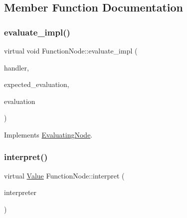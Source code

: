 \subsection{Member Function Documentation}
\mbox{\label{classFunctionNode_a697f1fdc368f5ad09284b32b4466f353}} 
\subsubsection{\texorpdfstring{evaluate\+\_\+impl()}{evaluate\_impl()}}
{\footnotesize\ttfamily virtual void Function\+Node\+::evaluate\+\_\+impl (\begin{DoxyParamCaption}\item[{\hyperlink{classSystemHandler}{System\+Handler} $\ast$}]{handler,  }\item[{\hyperlink{statics_8h_a6664c451ca7787483a7981cc1de68dbb}{E\+V\+A\+L\+U\+A\+T\+I\+O\+N\+\_\+\+T\+Y\+PE}}]{expected\+\_\+evaluation,  }\item[{struct \hyperlink{structEvaluation}{Evaluation} $\ast$}]{evaluation }\end{DoxyParamCaption})\hspace{0.3cm}{\ttfamily [virtual]}}



Implements \hyperlink{classEvaluatingNode_a085fa06e0b46a93c814dc55cda0c1b26}{Evaluating\+Node}.

\mbox{\label{classFunctionNode_a059e6682cd51d0e126372a7af257ea5a}} 
\subsubsection{\texorpdfstring{interpret()}{interpret()}}
{\footnotesize\ttfamily virtual \hyperlink{classValue}{Value} Function\+Node\+::interpret (\begin{DoxyParamCaption}\item[{\hyperlink{classInterpreter}{Interpreter} $\ast$}]{interpreter }\end{DoxyParamCaption})\hspace{0.3cm}{\ttfamily [virtual]}}



